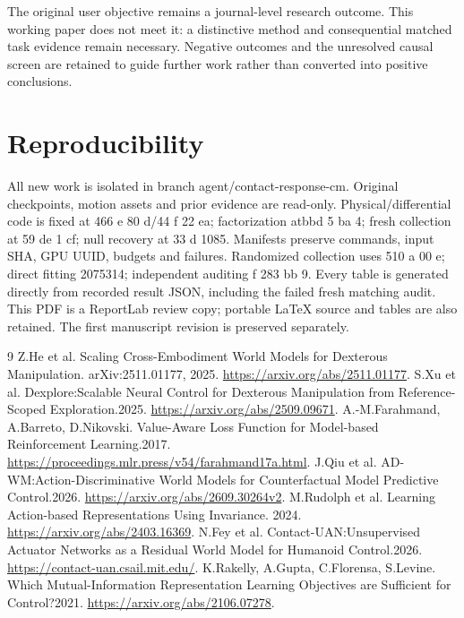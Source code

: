\documentclass[10pt]{article}
\begin{document}
The original user objective remains a journal-level research outcome. This working
paper does not meet it: a distinctive method and consequential matched task evidence
remain necessary. Negative outcomes and the unresolved causal screen are retained
to guide further work rather than converted into positive conclusions.

\section*{Reproducibility}
All new work is isolated in branch agent/contact-response-cm. Original checkpoints,
motion assets and prior evidence are read-only. Physical/differential code is fixed
at 466 e 80 d/44 f 22 ea; factorization atbbd 5 ba 4; fresh collection at 59 de 1 cf; null recovery
at 33 d 1085. Manifests preserve commands, input SHA, GPU UUID, budgets and failures.
Randomized collection uses 510 a 00 e; direct fitting 2075314; independent auditing
f 283 bb 9. Every table is generated directly from recorded result JSON, including the failed
fresh matching audit. This PDF is a ReportLab review copy; portable LaTeX source
and tables are also retained. The first manuscript revision is preserved separately.

\begin{thebibliography}{9}
 Z.He et al. Scaling Cross-Embodiment World Models for Dexterous Manipulation.
arXiv:2511.01177, 2025. \url{https://arxiv.org/abs/2511.01177}.
 S.Xu et al. Dexplore:Scalable Neural Control for Dexterous Manipulation
from Reference-Scoped Exploration.2025. \url{https://arxiv.org/abs/2509.09671}.
 A.-M.Farahmand, A.Barreto, D.Nikovski. Value-Aware Loss Function
for Model-based Reinforcement Learning.2017. \url{https://proceedings.mlr.press/v54/farahmand17a.html}.
 J.Qiu et al. AD-WM:Action-Discriminative World Models for Counterfactual
Model Predictive Control.2026. \url{https://arxiv.org/abs/2609.30264v2}.
 M.Rudolph et al. Learning Action-based Representations Using Invariance.
2024. \url{https://arxiv.org/abs/2403.16369}.
 N.Fey et al. Contact-UAN:Unsupervised Actuator Networks as a Residual
World Model for Humanoid Control.2026. \url{https://contact-uan.csail.mit.edu/}.
 K.Rakelly, A.Gupta, C.Florensa, S.Levine. Which Mutual-Information
Representation Learning Objectives are Sufficient for Control?2021.
\url{https://arxiv.org/abs/2106.07278}.
\end{thebibliography}
\end{document}
